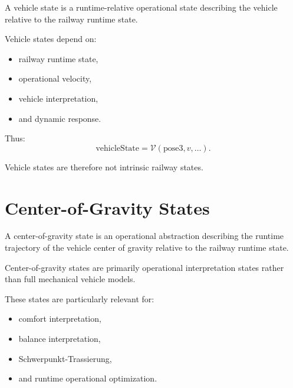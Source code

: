 \begin{definition}
\label{def:taxonomy-vehicle-state}
A vehicle state is a runtime-relative operational state describing the
vehicle relative to the railway runtime state.
\end{definition}

\begin{remark}
Vehicle states depend on:
\begin{itemize}
\item railway runtime state,
\item operational velocity,
\item vehicle interpretation,
\item and dynamic response.
\end{itemize}
\end{remark}

\begin{remark}
Thus:
\[
\mathrm{vehicleState}
=
\mathcal V(
\mathrm{pose3},
v,
\dots
).
\]
\end{remark}

\begin{remark}
Vehicle states are therefore not intrinsic railway states.
\end{remark}

\section{Center-of-Gravity States}

\begin{definition}
\label{def:taxonomy-cg-state}
A center-of-gravity state is an operational abstraction describing the
runtime trajectory of the vehicle center of gravity relative to the
railway runtime state.
\end{definition}

\begin{remark}
Center-of-gravity states are primarily operational interpretation states
rather than full mechanical vehicle models.
\end{remark}

\begin{remark}
These states are particularly relevant for:
\begin{itemize}
\item comfort interpretation,
\item balance interpretation,
\item Schwerpunkt-Trassierung,
\item and runtime operational optimization.
\end{itemize}
\end{remark}

